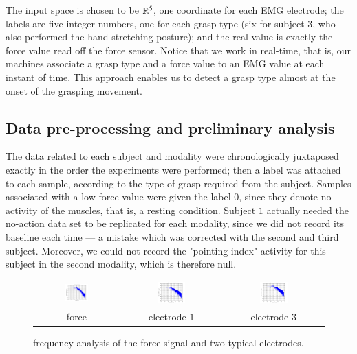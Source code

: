The input space is chosen to be $\mathbb{R}^5$, one coordinate for each EMG
electrode; the labels are five integer numbers, one for each grasp
type (six for subject $3$, who also performed the hand stretching
posture); and the real value is exactly the force value read off the
force sensor. Notice that we work in real-time, that is, our machines
associate a grasp type and a force value to an EMG value at each
instant of time. This approach enables us to detect a grasp type
almost at the onset of the grasping movement.

\subsection{Data pre-processing and preliminary analysis}

The data related to each subject and modality were chronologically
juxtaposed exactly in the order the experiments were performed; then a
label was attached to each sample, according to the type of grasp
required from the subject. Samples associated with a low force value
were given the label $0$, since they denote no activity of the
muscles, that is, a resting condition. Subject $1$ actually needed the
no-action data set to be replicated for each modality, since we did
not record its baseline each time --- a mistake which was corrected
with the second and third subject. Moreover, we could not record the
"pointing index" activity for this subject in the second modality,
which is therefore null.

\begin{figure}[!ht] \centering
  \begin{tabular}{ccc}
    \includegraphics[width=0.3\textwidth]{figs/spectrum_force} &
    \includegraphics[width=0.3\textwidth]{figs/spectrum_electrode_1} &
    \includegraphics[width=0.3\textwidth]{figs/spectrum_electrode_3} \\
    force & electrode $1$ & electrode $3$ \\
  \end{tabular}
  \caption{frequency analysis of the force signal and two
    typical electrodes.}
  \label{fig:spectra}
\end{figure}

